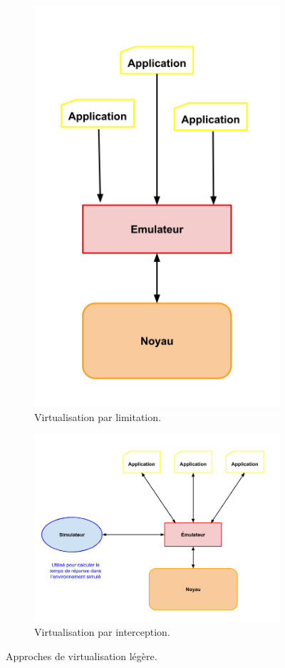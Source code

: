 \begin{figure}[H]
  \centering
  \begin{subfigure}{0.3\textwidth}
    \includegraphics[scale=0.38]{Pictures/png/Virtualisation_limitation}
    \caption{Virtualisation par limitation.}
    \label{Virtu_limitation}
  \end{subfigure}
  \begin{subfigure}{0.3\textwidth}
    \includegraphics[scale=0.3]{Pictures/png/Virtualisation_interception}
    \caption{Virtualisation par interception.}
    \label{Virtu_interception}
  \end{subfigure}
  \caption{Approches de virtualisation légère.}
  \label{TYPE_VIRTUALISATION}
\end{figure}
